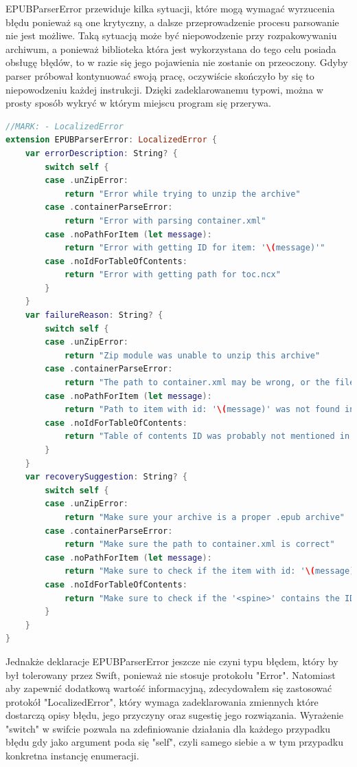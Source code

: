 EPUBParserError przewiduje kilka sytuacji, które mogą wymagać wyrzucenia błędu ponieważ są one krytyczny, a dalsze przeprowadzenie procesu parsowanie nie jest możliwe. Taką sytuacją może być niepowodzenie przy rozpakowywaniu archiwum, a ponieważ biblioteka która jest wykorzystana do tego celu posiada obsługę błędów, to w razie się jego pojawienia nie zostanie on przeoczony. Gdyby parser próbował kontynuować swoją pracę, oczywiście skończyło by się to niepowodzeniu każdej instrukcji. Dzięki zadeklarowanemu typowi, można w prosty sposób wykryć w którym miejscu program się przerywa.

\begin{lstlisting}[firstnumber=8,caption={Rozszeżenie EPUBParserError z zastosowaniem protokołu LocalizedError.},language=swift]
//MARK: - LocalizedError
extension EPUBParserError: LocalizedError {
    var errorDescription: String? {
        switch self {
        case .unZipError:
            return "Error while trying to unzip the archive"
        case .containerParseError:
            return "Error with parsing container.xml"
        case .noPathForItem (let message):
            return "Error with getting ID for item: '\(message)'"
        case .noIdForTableOfContents:
            return "Error with getting path for toc.ncx"
        }
    }
    var failureReason: String? {
        switch self {
        case .unZipError:
            return "Zip module was unable to unzip this archive"
        case .containerParseError:
            return "The path to container.xml may be wrong, or the file itself may be missing"
        case .noPathForItem (let message):
            return "Path to item with id: '\(message)' was not found in the manifest!"
        case .noIdForTableOfContents:
            return "Table of contents ID was probably not mentioned in the spine"
        }
    }
    var recoverySuggestion: String? {
        switch self {
        case .unZipError:
            return "Make sure your archive is a proper .epub archive"
        case .containerParseError:
            return "Make sure the path to container.xml is correct"
        case .noPathForItem (let message):
            return "Make sure to check if the item with id: '\(message)' is in the manifest!"
        case .noIdForTableOfContents:
            return "Make sure to check if the '<spine>' contains the ID for TOC"
        }
    }
}
\end{lstlisting}

Jednakże deklaracje EPUBParserError jeszcze nie czyni typu błędem, który by był tolerowany przez Swift, ponieważ nie stosuje protokołu "Error". Natomiast aby zapewnić dodatkową wartość informacyjną, zdecydowałem się zastosować protokół "LocalizedError", który wymaga zadeklarowania zmiennych które dostarczą opisy błędu, jego przyczyny oraz sugestię jego rozwiązania. Wyrażenie "switch" w swifcie pozwala na zdefiniowanie działania dla każdego przypadku błędu gdy jako argument poda się "self", czyli samego siebie a w tym przypadku konkretna instancję enumeracji.

